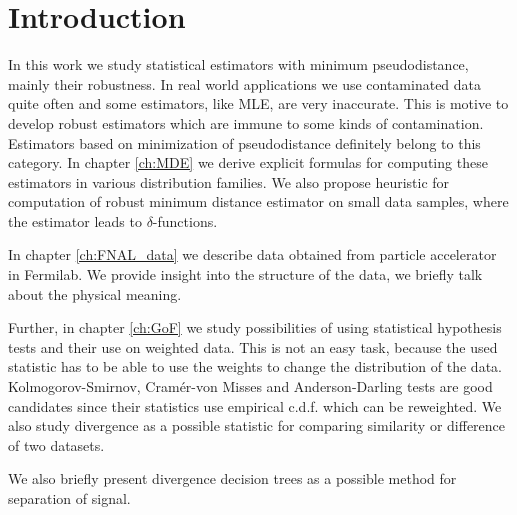 \chapter*{Introduction}

In this work we study statistical estimators with minimum \ren pseudodistance, mainly their robustness. In real world applications we use contaminated data quite often and some estimators, like MLE, are very inaccurate. This is motive to develop robust estimators which are immune to some kinds of contamination. Estimators based on minimization of \ren pseudodistance definitely belong to this category. In chapter \ref{ch:MDE} we derive explicit formulas for computing these estimators in various distribution families. We also propose heuristic for computation of robust minimum \ren distance estimator on small data samples, where the estimator leads to $\delta$-functions.

In chapter \ref{ch:FNAL_data} we describe data obtained from particle accelerator in Fermilab. We provide insight into the structure of the data, we briefly talk about the physical meaning.

Further, in chapter \ref{ch:GoF} we study possibilities of using statistical hypothesis tests and their use on weighted data. This is not an easy task, because the used statistic has to be able to use the weights to change the distribution of the data. Kolmogorov-Smirnov, Cramér-von Misses and Anderson-Darling tests are good candidates since their statistics use empirical c.d.f. which can be reweighted. We also study  \ren divergence as a possible statistic for comparing similarity or difference of two datasets.

We also briefly present divergence decision trees as a possible method for separation of signal.



